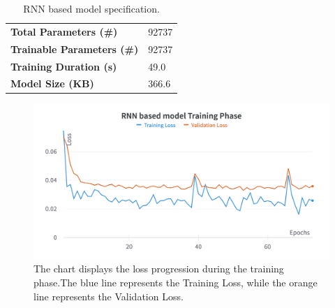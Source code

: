 \begin{table}[H]
	\begin{center}
		\begin{tabular}[c]{l|l}
			\textbf{Total Parameters (\#)}     & 92737 \\
			\textbf{Trainable Parameters (\#)} & 92737 \\
			\textbf{Training Duration (s)}     & 49.0  \\
			\textbf{Model Size (KB)}           & 366.6
		\end{tabular}
	\end{center}
	\caption{RNN based model specification.}\label{tab:grrunspecs}
\end{table}

\begin{figure}[H]
	\centering
	\includegraphics[width=.8\linewidth]{chapters/3_models/imgs/grrun/grruntraining.png}
	\caption{The chart displays the loss progression during the training phase.The blue line represents the Training Loss, while the orange line represents the Validation Loss.}
	\label{fig:grruntraining}
\end{figure}

